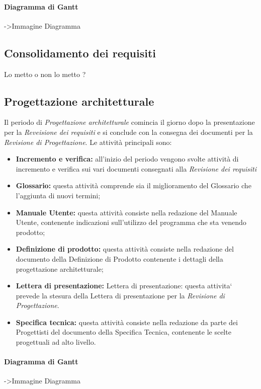 \paragraph{Diagramma di Gantt}
->Immagine Diagramma
\subsection{Consolidamento dei requisiti}
Lo metto o non lo metto ?
\subsection{Progettazione architetturale}
Il periodo di \textit{Progettazione architetturale} comincia il giorno dopo la presentazione per la \textit{Reveisione dei requisiti} e si conclude con la consegna dei documenti per la \textit{Revisione di Progettazione}. Le attività principali sono:
\begin{itemize}
	\item{\textbf{Incremento e verifica:} all'inizio del periodo vengono svolte attività di incremento e verifica sui vari documenti consegnati alla \textit{Revisione dei requisiti}}
	\item{\textbf{Glossario:} questa attività comprende sia il miglioramento del Glossario che l’aggiunta di nuovi termini;}
	\item{\textbf{Manuale Utente:}  questa attività consiste nella redazione del Manuale Utente, contenente indicazioni sull’utilizzo del programma che sta venendo prodotto;}
	\item{\textbf{Definizione di prodotto:} questa attività consiste nella redazione del documento della Definizione di Prodotto contenente i dettagli della progettazione architetturale;}
	\item{\textbf{Lettera di presentazione:} Lettera di presentazione: questa attivita` prevede la stesura della Lettera di presentazione per la \textit{Revisione di Progettazione}.}
	\item{\textbf{Specifica tecnica:} questa attività consiste nella redazione da parte dei Progettisti del documento della Specifica Tecnica, contenente le scelte progettuali ad alto livello.}
\end{itemize}
\paragraph{Diagramma di Gantt}
->Immagine Diagramma
